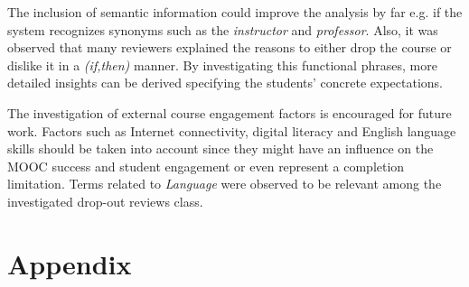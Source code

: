 \documentclass[
	a4paper,
	pdftex,
	12pt,	
	footinclude=true,
	fleqn,
	final,
	]{report}%
\begin{document}
The inclusion of semantic information could improve the analysis by far
e.g. if the system recognizes synonyms such as the \emph{instructor}
and \emph{professor}. Also, it was observed that many reviewers 
explained the reasons to either drop the course or dislike it 
in a \emph{(if,then)} manner. By investigating this functional 
phrases, more detailed insights can be derived
specifying the students' concrete expectations.

The investigation of external course engagement 
factors is encouraged for future work.
Factors such as Internet connectivity, digital 
literacy and English language skills should be taken into account 
since they might have an influence on the 
MOOC success and student engagement or even 
represent a completion limitation. 
Terms related to \emph{Language} were observed
to be relevant among the investigated drop-out 
reviews class.

\newpage


\newpage

\appendix
\chapter*{Appendix}
\vspace{-0.6cm}
\label{ch:appendix}

\renewcommand{\thesection}{\Alph{section}}
\renewcommand\thefigure{\thesection.\arabic{figure}}
\end{document}
